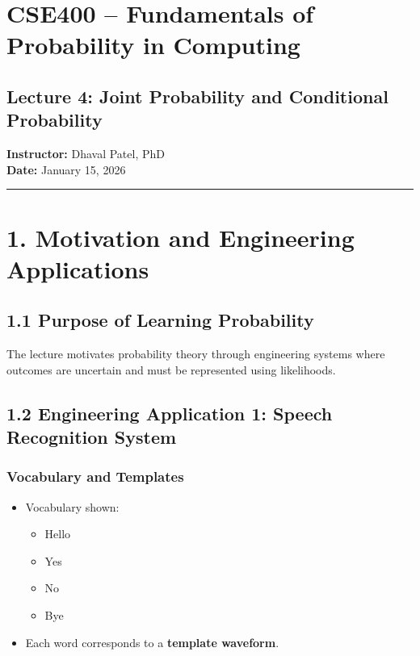 \documentclass[12pt]{article}
\begin{document}
\section*{CSE400 – Fundamentals of Probability in Computing}

\subsection*{Lecture 4: Joint Probability and Conditional Probability}

\textbf{Instructor:} Dhaval Patel, PhD\\
\textbf{Date:} January 15, 2026

\hrule
\vspace{1em}

\section*{1. Motivation and Engineering Applications}

\subsection*{1.1 Purpose of Learning Probability}

The lecture motivates probability theory through engineering systems where outcomes are uncertain and must be represented using likelihoods.

\subsection*{1.2 Engineering Application 1: Speech Recognition System}

\subsubsection*{Vocabulary and Templates}

\begin{itemize}
  \item Vocabulary shown:
  \begin{itemize}
    \item Hello
    \item Yes
    \item No
    \item Bye
  \end{itemize}
  \item Each word corresponds to a \textbf{template waveform}.
\end{itemize}
\end{document}

